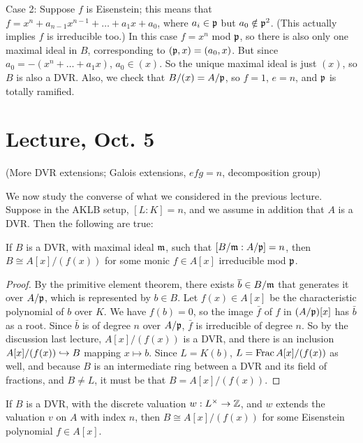 \documentclass[11pt]{amsart}
\begin{document}
Case 2: Suppose $f$ is Eisenstein; this means that $f = x^n + a_{n-1}x^{n-1} + \dots + a_1x + a_0$, where $a_i \in \mathfrak{p}$ but $a_0\notin\mathfrak{p}^2$. (This actually implies $f$ is irreducible too.) In this case $f = x^n$ mod $\mathfrak{p}$, so there is also only one maximal ideal in $B$, corresponding to $(\mathfrak{p}, x) = (a_0, x)$. But since $a_0 = -(x^n + \dots + a_1x)$, $a_0 \in (x)$. So the unique maximal ideal is just $(x)$, so $B$ is also a DVR. Also, we check that $B/(x) = A/\mathfrak{p}$, so $f = 1$, $e = n$, and $\mathfrak{p}$ is totally ramified.



\section{Lecture, Oct. 5}

(More DVR extensions; Galois extensions, $efg = n$, decomposition group)

We now study the converse of what we considered in the previous lecture. Suppose in the AKLB setup, $[L:K] = n$, and we assume in addition that $A$ is a DVR. Then the following are true:

\begin{prop}
If $B$ is a DVR, with maximal ideal $\mathfrak{m}$, such that $[B/\mathfrak{m}: A/\mathfrak{p}] = n$, then $B \cong A[x]/(f(x))$ for some monic $f\in A[x]$ irreducible mod $\mathfrak{p}$.
\end{prop}

\begin{proof}
By the primitive element theorem, there exists $\overline{b}\in B/\mathfrak{m}$ that generates it over $A/\mathfrak{p}$, which is represented by $b\in B$. Let $f(x)\in A[x]$ be the characteristic polynomial of $b$ over $K$. We have $f(b) = 0$, so the image $\bar{f}$ of $f$ in $(A/\mathfrak{p}) [x]$ has $\bar{b}$ as a root. Since $\bar{b}$ is of degree $n$ over $A/\mathfrak{p}$, $\bar{f}$ is irreducible of degree $n$. So by the discussion last lecture, $A[x]/(f(x))$ is a DVR, and there is an inclusion $A[x]/(f(x)) \hookrightarrow B$ mapping $x\mapsto b$. Since $L = K(b)$, $L = \operatorname{Frac} A[x]/(f(x))$ as well, and because $B$ is an intermediate ring between a DVR and its field of fractions, and $B\neq L$, it must be that $B = A[x]/(f(x))$.
\end{proof}

\begin{prop}
If $B$ is a DVR, with the discrete valuation $w: L^{\times}\to \mathbb{Z}$, and $w$ extends the valuation $v$ on $A$ with index $n$, then $B \cong A[x]/(f(x))$ for some Eisenstein polynomial $f\in A[x]$.
\end{prop}
\end{document}
